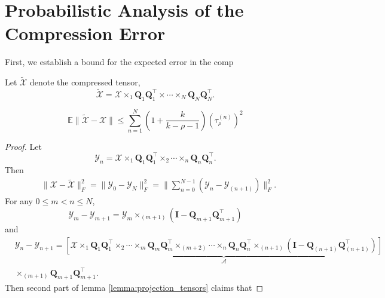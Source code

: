 \section{Probabilistic Analysis of the Compression Error}
First, we establish a bound for the expected error in the comp

Let $\tilde{\mathscr{X}}$ denote the compressed tensor, 
\begin{equation}
\tilde{\mathscr{X}} = \mathscr{X}\times_1  \mathbf{Q}_1\mathbf{Q}_1^\top \times \cdots \times_N \mathbf{Q}_N\mathbf{Q}_N^\top.
\end{equation}

\begin{lem}
\label{lemma: compression_error}
\begin{equation}
\mathbb{E}  \|\tilde{\mathscr{X}} - \mathscr{X}\|\le \sum_{n=1}^N \left(1+\frac{k}{k-\rho-1}\right)(\tau^{(n)}_\rho)^2 
\end{equation}
\begin{proof}
Let 
\begin{equation}
\mathscr{Y}_n = \mathscr{X} \times_1 \mathbf{Q}_1\mathbf{Q}_1^\top \times_2 \cdots \times_n \mathbf{Q}_n\mathbf{Q}_n^\top.
\end{equation}
Then 
\begin{equation}
\begin{aligned}
& \|\mathscr{X}-\tilde{\mathscr{X}}\|_F^2 = \|\mathscr{Y}_0 - \mathscr{Y}_N\|_F^2= \|\sum_{n=0}^{N-1} (\mathscr{Y}_n - \mathscr{Y}_{(n+1)})\|_F^2.
\end{aligned}
\end{equation}
For any $0\le m< n\le N$, 
\begin{equation}
\mathscr{Y}_m-\mathscr{Y}_{m+1} = \mathscr{Y}_{m} \times_{(m+1)} (\mathbf{I} - \mathbf{Q}_{m+1}\mathbf{Q}^\top_{m+1}) 
\end{equation}
and 
\begin{equation}
\begin{aligned}
&\mathscr{Y}_n - \mathscr{Y}_{n+1}  = \underbrace{\left[\mathscr{X}\times_1 \mathbf{Q}_{1}\mathbf{Q}^\top_{1} \times_2 \cdots \times_{m} \mathbf{Q}_{m}\mathbf{Q}^\top_{m}\times_{(m+2)} \cdots  \times_{n} \mathbf{Q}_{n}\mathbf{Q}^\top_{n}\times_{(n+1)}(\mathbf{I}-\mathbf{Q}_{(n+1)}\mathbf{Q}^\top_{(n+1)})\right]}_{\mathscr{A}}\\
&\times_{(m+1)} \mathbf{Q}_{m+1}\mathbf{Q}^\top_{m+1}.
\end{aligned}
\end{equation}
Then second part of lemma \ref{lemma:projection_tensors} claims that 

\end{proof}
\end{lem}
